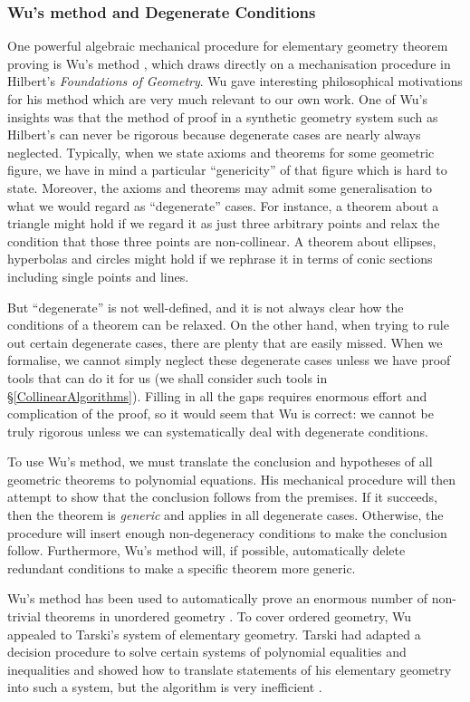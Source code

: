 \subsubsection{Wu's method and Degenerate Conditions}\label{degeneracy}
One powerful algebraic mechanical procedure for elementary geometry theorem proving is Wu's method \cite{WuMechanicalTheoremProving}, which draws directly on a mechanisation procedure in Hilbert's \emph{Foundations of Geometry}. Wu gave interesting philosophical motivations for his method which are very much relevant to our own work. One of Wu's insights was that the method of proof in a synthetic geometry system such as Hilbert's can never be rigorous because degenerate cases are nearly always neglected. Typically, when we state axioms and theorems for some geometric figure, we have in mind a particular ``genericity'' of that figure which is hard to state. Moreover, the axioms and theorems may admit some generalisation to what we would regard as ``degenerate'' cases. For instance, a theorem about a triangle might hold if we regard it as just three arbitrary points and relax the condition that those three points are non-collinear. A theorem about ellipses, hyperbolas and circles might hold if we rephrase it in terms of conic sections including single points and lines. 

But ``degenerate'' is not well-defined, and it is not always clear how the conditions of a theorem can be relaxed. On the other hand, when trying to rule out certain degenerate cases, there are plenty that are easily missed. When we formalise, we cannot simply neglect these degenerate cases unless we have proof tools that can do it for us (we shall consider such tools in \S\ref{CollinearAlgorithms}). Filling in all the gaps requires enormous effort and complication of the proof, so it would seem that Wu is correct: we cannot be truly rigorous unless we can systematically deal with degenerate conditions. 

To use Wu's method, we must translate the conclusion and hypotheses of all geometric theorems to polynomial equations. His mechanical procedure will then attempt to show that the conclusion follows from the premises. If it succeeds, then the theorem is \emph{generic} and applies in all degenerate cases. Otherwise, the procedure will insert enough non-degeneracy conditions to make the conclusion follow. Furthermore, Wu's method will, if possible, automatically delete redundant conditions to make a specific theorem more generic. 

Wu's method has been used to automatically prove an enormous number of non-trivial theorems in unordered geometry \cite{MechanicalGeometryTheoremProving}. To cover ordered geometry, Wu appealed to Tarski's system of elementary geometry. Tarski had adapted a decision procedure to solve certain systems of polynomial equalities and inequalities and showed how to translate statements of his elementary geometry into such a system, but the algorithm is very inefficient \cite{TarksiMcNaugtonReview}.


